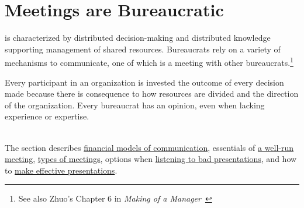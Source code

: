 \documentclass[openright]{book} %
\begin{document}
 \iftoggle{cpforsection}{\clearpage}{} %
     \iftoggle{cpforsection}{\clearpage}{} %
     \iftoggle{cpforsection}{\clearpage}{} %
     \iftoggle{cpforsection}{\clearpage}{} %
     \iftoggle{cpforsection}{\clearpage}{} %
     \iftoggle{cpforsection}{\clearpage}{} %
     \iftoggle{cpforsection}{\clearpage}{} 
    

    \section{Meetings are Bureaucratic\label{sec:meetings}}
\iftoggle{glossarysubstitutionworks}{\Gls{decentralized bureaucracy}}{Decentralized bureaucracy}
    is characterized by distributed decision-making and distributed knowledge supporting management of shared resources. Bureaucrats rely on a variety of mechanisms to communicate, one of which is a meeting with other bureaucrats.\footnote{See also Zhuo's Chapter 6 in \textit{Making of a Manager}~\cite{2019_Zhuo}} 

    Every participant in an organization is invested the outcome of every decision made because there is consequence to how resources are divided and the direction of the organization. Every bureaucrat has an opinion, even when lacking experience or expertise. 

    \ \\

    The section describes \hyperref[sec:financial-models-of-communication]{financial models of communication}, essentials of \hyperref[sec:well-run-meeting]{a well-run meeting}, \hyperref[sec:characterizing-meetings]{types of meetings}, options when \hyperref[sec:bad-presentations]{listening to bad presentations}, and how to \hyperref[sec:effective-presentations]{make effective presentations}.

        
         
         
         
        
        
\end{document}
